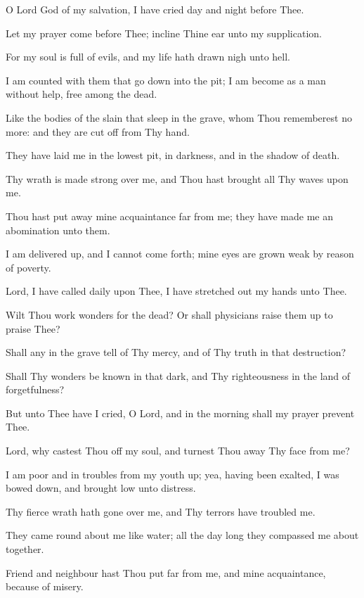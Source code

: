 O Lord God of my salvation, I have cried day and night before Thee.

Let my prayer come before Thee; incline Thine ear unto my supplication.

For my soul is full of evils, and my life hath drawn nigh unto hell.

I am counted with them that go down into the pit; I am become as a man without help, free among the dead.

Like the bodies of the slain that sleep in the grave, whom Thou rememberest no more: and they are cut off from Thy hand.

They have laid me in the lowest pit, in darkness, and in the shadow of death.

Thy wrath is made strong over me, and Thou hast brought all Thy waves upon me.

Thou hast put away mine acquaintance far from me; they have made me an abomination unto them.

I am delivered up, and I cannot come forth; mine eyes are grown weak by reason of poverty.

Lord, I have called daily upon Thee, I have stretched out my hands unto Thee.

Wilt Thou work wonders for the dead? Or shall physicians raise them up to praise Thee?

Shall any in the grave tell of Thy mercy, and of Thy truth in that destruction?

Shall Thy wonders be known in that dark, and Thy righteousness in the land of forgetfulness?

But unto Thee have I cried, O Lord, and in the morning shall my prayer prevent Thee.

Lord, why castest Thou off my soul, and turnest Thou away Thy face from me?

I am poor and in troubles from my youth up; yea, having been exalted, I was bowed down, and brought low unto distress.

Thy fierce wrath hath gone over me, and Thy terrors have troubled me.

They came round about me like water; all the day long they compassed me about together.

Friend and neighbour hast Thou put far from me, and mine acquaintance, because of misery.
